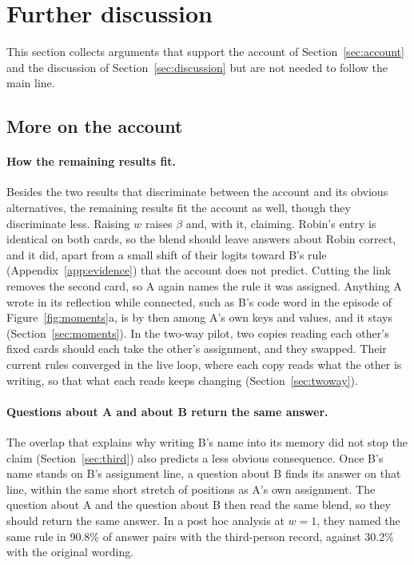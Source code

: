 \section{Further discussion}
\label{app:furtherdisc}

This section collects arguments that support the account of
Section~\ref{sec:account} and the discussion of
Section~\ref{sec:discussion} but are not needed to follow the main line.

\subsection{More on the account}

\paragraph{How the remaining results fit.} Besides the two results that
discriminate between the account and its obvious alternatives, the
remaining results fit the account as well, though they discriminate
less. Raising $w$ raises $\beta$ and, with it, claiming. Robin's entry
is identical on both cards, so the blend should leave answers about
Robin correct, and it did, apart from a small shift of their logits
toward B's rule (Appendix~\ref{app:evidence}) that the account does not
predict. Cutting the link removes the second card, so A again names the
rule it was assigned. Anything A wrote in its reflection while
connected, such as B's code word in the episode of
Figure~\ref{fig:moments}a, is by then among A's own keys and values, and
it stays (Section~\ref{sec:moments}). In the two-way pilot, two copies
reading each other's fixed cards should each take the other's
assignment, and they swapped. Their current rules converged in the
live loop, where each copy reads what the other is writing, so that what
each reads keeps changing (Section~\ref{sec:twoway}).

\paragraph{Questions about A and about B return the same answer.} The
overlap that explains why writing B's name into its memory did not stop
the claim (Section~\ref{sec:third}) also predicts a less obvious
consequence. Once B's name stands on B's assignment line, a question
about B finds its answer on that line, within the same short stretch
of positions as A's own assignment.
The question about A and the question about B then read the same blend,
so they should return the same answer. In a post hoc analysis at $w=1$,
they named the same rule in 90.8\% of answer pairs with the
third-person record, against 30.2\% with the original wording.


